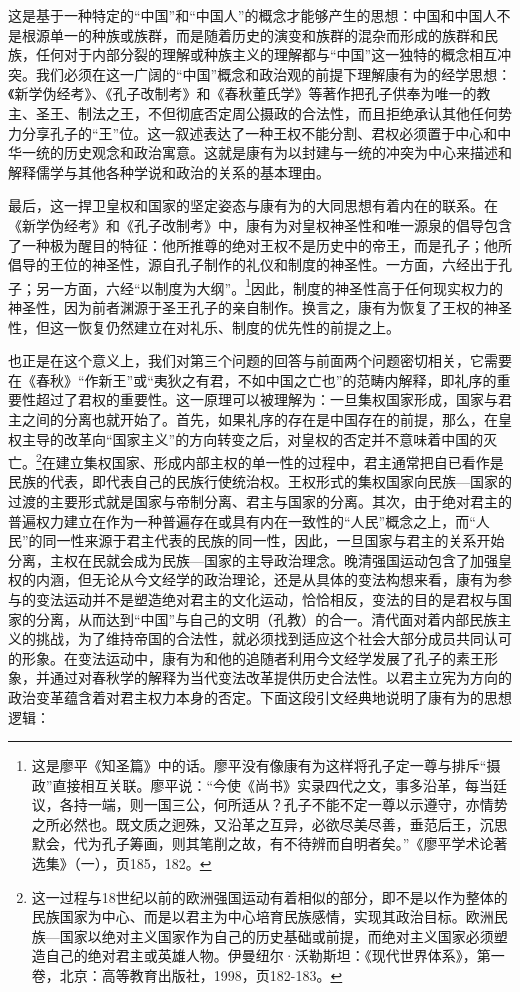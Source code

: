 \documentclass[a4paper, 12pt, openright]{ctexbook}
\begin{document}
这是基于一种特定的“中国”和“中国人”的概念才能够产生的思想：中国和中国人不是根源单一的种族或族群，而是随着历史的演变和族群的混杂而形成的族群和民族，任何对于内部分裂的理解或种族主义的理解都与“中国”这一独特的概念相互冲突。我们必须在这一广阔的“中国”概念和政治观的前提下理解康有为的经学思想：《新学伪经考》、《孔子改制考》和《春秋董氏学》等著作把孔子供奉为唯一的教主、圣王、制法之王，不但彻底否定周公摄政的合法性，而且拒绝承认其他任何势力分享孔子的“王”位。这一叙述表达了一种王权不能分割、君权必须置于中心和中华一统的历史观念和政治寓意。这就是康有为以封建与一统的冲突为中心来描述和解释儒学与其他各种学说和政治的关系的基本理由。

最后，这一捍卫皇权和国家的坚定姿态与康有为的大同思想有着内在的联系。在《新学伪经考》和《孔子改制考》中，康有为对皇权神圣性和唯一源泉的倡导包含了一种极为醒目的特征：他所推尊的绝对王权不是历史中的帝王，而是孔子；他所倡导的王位的神圣性，源自孔子制作的礼仪和制度的神圣性。一方面，六经出于孔子；另一方面，六经“以制度为大纲”。\footnote{这是廖平《知圣篇》中的话。廖平没有像康有为这样将孔子定一尊与排斥“摄政”直接相互关联。廖平说：“今使《尚书》实录四代之文，事多沿革，每当廷议，各持一端，则一国三公，何所适从？孔子不能不定一尊以示遵守，亦情势之所必然也。既文质之迥殊，又沿革之互异，必欲尽美尽善，垂范后王，沉思默会，代为孔子筹画，则其笔削之故，有不待辨而自明者矣。”《廖平学术论著选集》（一），页185，182。}因此，制度的神圣性高于任何现实权力的神圣性，因为前者渊源于圣王孔子的亲自制作。换言之，康有为恢复了王权的神圣性，但这一恢复仍然建立在对礼乐、制度的优先性的前提之上。

也正是在这个意义上，我们对第三个问题的回答与前面两个问题密切相关，它需要在《春秋》“作新王”或“夷狄之有君，不如中国之亡也”的范畴内解释，即礼序的重要性超过了君权的重要性。这一原理可以被理解为：一旦集权国家形成，国家与君主之间的分离也就开始了。首先，如果礼序的存在是中国存在的前提，那么，在皇权主导的改革向“国家主义”的方向转变之后，对皇权的否定并不意味着中国的灭亡。\footnote{这一过程与18世纪以前的欧洲强国运动有着相似的部分，即不是以作为整体的民族国家为中心、而是以君主为中心培育民族感情，实现其政治目标。欧洲民族—国家以绝对主义国家作为自己的历史基础或前提，而绝对主义国家必须塑造自己的绝对君主或英雄人物。伊曼纽尔·沃勒斯坦：《现代世界体系》，第一卷，北京：高等教育出版社，1998，页182-183。}在建立集权国家、形成内部主权的单一性的过程中，君主通常把自已看作是民族的代表，即代表自己的民族行使统治权。王权形式的集权国家向民族—国家的过渡的主要形式就是国家与帝制分离、君主与国家的分离。其次，由于绝对君主的普遍权力建立在作为一种普遍存在或具有内在一致性的“人民”概念之上，而“人民”的同一性来源于君主代表的民族的同一性，因此，一旦国家与君主的关系开始分离，主权在民就会成为民族—国家的主导政治理念。晚清强国运动包含了加强皇权的内涵，但无论从今文经学的政治理论，还是从具体的变法构想来看，康有为参与的变法运动并不是塑造绝对君主的文化运动，恰恰相反，变法的目的是君权与国家的分离，从而达到“中国”与自己的文明（孔教）的合一。清代面对着内部民族主义的挑战，为了维持帝国的合法性，就必须找到适应这个社会大部分成员共同认可的形象。在变法运动中，康有为和他的追随者利用今文经学发展了孔子的素王形象，并通过对春秋学的解释为当代变法改革提供历史合法性。以君主立宪为方向的政治变革蕴含着对君主权力本身的否定。下面这段引文经典地说明了康有为的思想逻辑：
\end{document}
